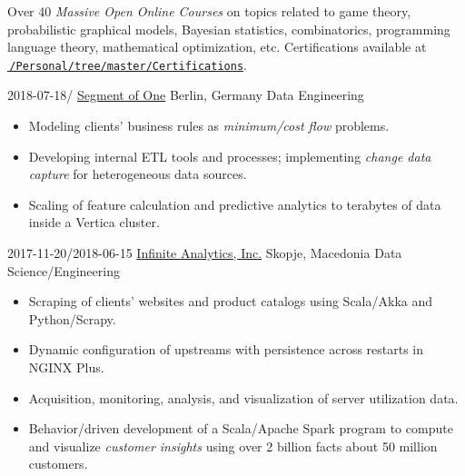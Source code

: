 \documentclass[version=last, fontsize=10pt, paper=A4, toc=bibliography]{scrartcl}%
\begin{document}
\begin{tcolorbox}[size=fbox, fontupper=\small, fontlower=\footnotesize]
  Over \num{40} \emph{Massive Open Online Courses} on topics related to game
  theory, probabilistic graphical models, Bayesian statistics, combinatorics,
  programming language theory, mathematical optimization, etc.%
  \tcblower%
  Certifications available at
  \href{https://github.com/d125q/Personal/tree/master/Certifications}%
  {\faGithub\,\nolinkurl{/Personal/tree/master/Certifications}}.
\end{tcolorbox}

\label{sec:experience}

\WorkEntry%
{2018-07-18/}%
{\href{https://www.so1.ai/en/}{Segment of One}}%
{Berlin, Germany}%
{Data Engineering}%
{%
  \begin{itemize}[noitemsep, leftmargin=*]
  \item Modeling clients' business rules as \emph{minimum\-/cost flow} problems.
  \item Developing internal ETL tools and processes; implementing
    \emph{change data capture} for heterogeneous data sources.
  \item Scaling of feature calculation and predictive analytics to terabytes of
    data inside a Vertica cluster.
  \end{itemize}
}

\WorkEntry%
{2017-11-20/2018-06-15}%
{\href{http://infiniteanalytics.com/}{Infinite Analytics, Inc.}}%
{Skopje, Macedonia}%
{Data Science/Engineering}%
{%
  \begin{itemize}[noitemsep, leftmargin=*]
  \item Scraping of clients' websites and product catalogs using Scala/Akka and
    Python/Scrapy.
  \item Dynamic configuration of upstreams with persistence across restarts in
    NGINX Plus.
  \item Acquisition, monitoring, analysis, and visualization of server
    utilization data.
  \item Behavior\-/driven development of a Scala/Apache Spark program to compute
    and visualize \emph{customer insights} using over \num{2} billion facts
    about \num{50} million customers.
  \end{itemize}%
}
\end{document}
